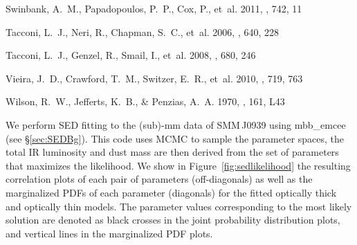 \documentclass[iop, revtex4]{emulateapj}
\begin{document}
\begin{thebibliography}{}
{Swinbank}, A.~M., {Papadopoulos}, P.~P., {Cox}, P., {et~al.} 2011, \apj, 742,
  11

{Tacconi}, L.~J., {Neri}, R., {Chapman}, S.~C., {et~al.} 2006, \apj, 640, 228

{Tacconi}, L.~J., {Genzel}, R., {Smail}, I., {et~al.} 2008, \apj, 680, 246

{Vieira}, J.~D., {Crawford}, T.~M., {Switzer}, E.~R., {et~al.} 2010, \apj, 719,
  763

{Wilson}, R.~W., {Jefferts}, K.~B., \& {Penzias}, A.~A. 1970, \apjl, 161, L43

\end{thebibliography}

\clearpage
\begin{turnpage}

\clearpage
\end{turnpage}


\appendix
We perform SED fitting to the (sub)-mm data of SMM\,J0939 using {\sc mbb\_emcee} (see \S \ref{sec:SEDBg}). This code uses MCMC to sample the parameter spaces, the total IR luminosity and dust mass are then derived from the set of parameters that maximizes the likelihood.
We show in Figure~\ref{fig:sedlikelihood} the resulting correlation plots of each pair of parameters (off-diagonals) as well as the marginalized PDFs of each parameter (diagonals) for the fitted optically thick and optically thin models.
The parameter values corresponding to the most likely solution are denoted as black crosses in the joint probability distribution plots, and vertical lines in the marginalized PDF plots. \par
\end{document}
